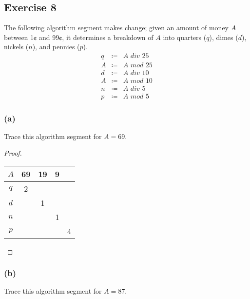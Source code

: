 \documentclass[14pt]{extarticle}
\begin{document}
\subsection{Exercise 8}
The following algorithm segment makes change; given an amount of money $A$ between 1¢ and 99¢, it determines a breakdown of $A$ into quarters ($q$), dimes ($d$), nickels ($n$), and pennies ($p$).
\[
    \begin{array}{rcl}
        q & \coloneqq & A \,\, div \,\, 25 \\
        A & \coloneqq & A \,\, mod \,\, 25 \\
        d & \coloneqq & A \,\, div \,\, 10 \\
        A & \coloneqq & A \,\, mod \,\, 10 \\
        n & \coloneqq & A \,\, div \,\, 5  \\
        p & \coloneqq & A \,\, mod \,\, 5
    \end{array}
\]
\subsubsection{(a)}
Trace this algorithm segment for $A = 69$.

\begin{proof}
    \begin{center}
        \begin{tabular}{|c|c|c|c|c|}
            \hline
            $A$ & 69 & 19 & 9 &   \\
            \hline
            $q$ & 2  &    &   &   \\
            \hline
            $d$ &    & 1  &   &   \\
            \hline
            $n$ &    &    & 1 &   \\
            \hline
            $p$ &    &    &   & 4 \\
            \hline
        \end{tabular}
    \end{center}
\end{proof}

\subsubsection{(b)}
Trace this algorithm segment for $A = 87$.
\end{document}
